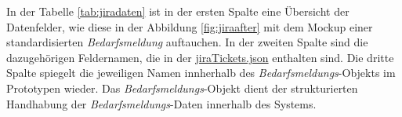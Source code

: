 In der Tabelle \ref{tab:jiradaten} ist in der ersten Spalte eine Übersicht der Datenfelder, wie diese in der Abbildung \ref{fig:jiraafter} mit dem Mockup einer standardisierten \emph{Bedarfsmeldung} auftauchen. In der zweiten Spalte sind die dazugehörigen Feldernamen, die in der \url{jiraTickets.json} enthalten sind. Die dritte Spalte spiegelt die jeweiligen Namen innherhalb des  \emph{Bedarfsmeldungs}-Objekts im Prototypen wieder. Das  \emph{Bedarfsmeldungs}-Objekt dient der strukturierten Handhabung der \emph{Bedarfsmeldungs}-Daten innerhalb des Systems.

